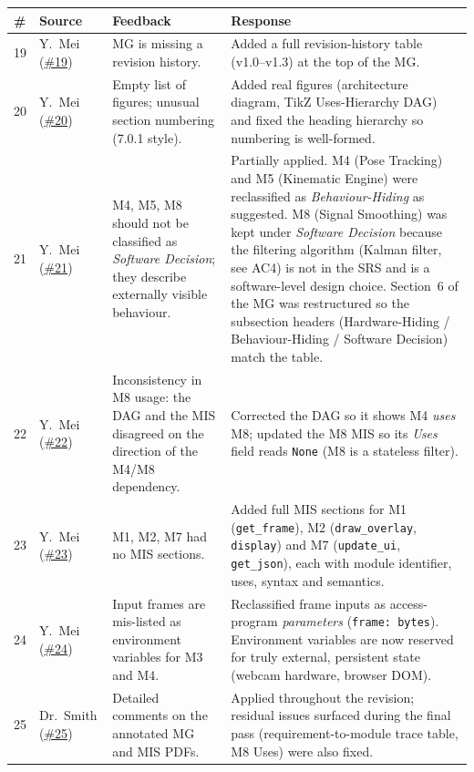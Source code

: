 \documentclass{article}
\begin{document}
\begin{longtable}{p{} p{} p{} p{}}
\toprule
\textbf{\#} & \textbf{Source} & \textbf{Feedback} & \textbf{Response}\\
\midrule
\endhead
19 & Y.~Mei (\href{https://github.com/mmdmirh/cas741/issues/19}{\#19}) &
MG is missing a revision history. &
Added a full revision-history table (v1.0--v1.3) at the top of the MG.\\
20 & Y.~Mei (\href{https://github.com/mmdmirh/cas741/issues/20}{\#20}) &
Empty list of figures; unusual section numbering (7.0.1 style). &
Added real figures (architecture diagram, TikZ Uses-Hierarchy DAG) and fixed
the heading hierarchy so numbering is well-formed.\\
21 & Y.~Mei (\href{https://github.com/mmdmirh/cas741/issues/21}{\#21}) &
M4, M5, M8 should not be classified as \emph{Software Decision}; they describe
externally visible behaviour. &
Partially applied. M4 (Pose Tracking) and M5 (Kinematic Engine) were
reclassified as \emph{Behaviour-Hiding} as suggested. M8 (Signal Smoothing)
was kept under \emph{Software Decision} because the filtering algorithm
(Kalman filter, see AC4) is not in the SRS and is a software-level design
choice. Section~6 of the MG was restructured so the subsection headers
(Hardware-Hiding / Behaviour-Hiding / Software Decision) match the table.\\
22 & Y.~Mei (\href{https://github.com/mmdmirh/cas741/issues/22}{\#22}) &
Inconsistency in M8 usage: the DAG and the MIS disagreed on the direction of
the M4/M8 dependency. &
Corrected the DAG so it shows M4 \emph{uses} M8; updated the M8 MIS so its
\emph{Uses} field reads \texttt{None} (M8 is a stateless filter).\\
23 & Y.~Mei (\href{https://github.com/mmdmirh/cas741/issues/23}{\#23}) &
M1, M2, M7 had no MIS sections. &
Added full MIS sections for M1 (\texttt{get\_frame}), M2 (\texttt{draw\_overlay},
\texttt{display}) and M7 (\texttt{update\_ui}, \texttt{get\_json}), each with
module identifier, uses, syntax and semantics.\\
24 & Y.~Mei (\href{https://github.com/mmdmirh/cas741/issues/24}{\#24}) &
Input frames are mis-listed as environment variables for M3 and M4. &
Reclassified frame inputs as access-program \emph{parameters}
(\texttt{frame: bytes}). Environment variables are now reserved for truly
external, persistent state (webcam hardware, browser DOM).\\
25 & Dr.~Smith (\href{https://github.com/mmdmirh/cas741/issues/25}{\#25}) &
Detailed comments on the annotated MG and MIS PDFs. &
Applied throughout the revision; residual issues surfaced during the final
pass (requirement-to-module trace table, M8 Uses) were also fixed.\\
\bottomrule
\end{longtable}
\end{document}

